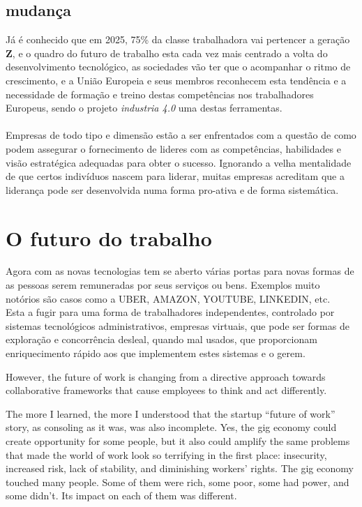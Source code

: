 \subsection{mudança}
Já é conhecido que em \textsf{2025}, 75\% da classe trabalhadora vai pertencer a geração \textbf{Z}, e o quadro do futuro de trabalho esta cada vez mais centrado a volta do desenvolvimento tecnológico, as sociedades vão ter que o acompanhar o ritmo de crescimento, e a União Europeia e seus membros reconhecem esta tendência e a necessidade de formação e treino destas competências nos trabalhadores Europeus, sendo o projeto \textit{industria 4.0} uma destas ferramentas.\\
\\
Empresas de todo tipo e dimensão estão a ser enfrentados com a questão de como podem assegurar o fornecimento de lideres com as competências, habilidades e visão estratégica adequadas para obter o sucesso. Ignorando a velha mentalidade de que certos indivíduos nascem para liderar, muitas empresas acreditam que a liderança pode ser desenvolvida numa forma pro-ativa e de forma sistemática.\cite{book_6}
\section{O futuro do trabalho}
\qquad Agora com as novas tecnologias tem se aberto várias portas para novas formas de as pessoas serem remuneradas por seus serviços ou bens. Exemplos muito notórios são casos como a UBER, AMAZON, YOUTUBE, LINKEDIN, etc.\\

Esta a fugir para uma forma de trabalhadores independentes, controlado por sistemas tecnológicos administrativos, empresas virtuais, que pode ser formas de exploração e concorrência desleal, quando mal usados, que proporcionam enriquecimento rápido aos que implementem estes sistemas e o gerem.

However, the future of work is changing from a directive approach towards collaborative frameworks that cause employees to think and act differently.

The more I learned, the more I understood that the startup “future of work” story, as consoling as it was, was also incomplete. Yes, the gig economy could create opportunity for some people, but it also could amplify the same problems that made the world of work look so terrifying in the first place: insecurity, increased risk, lack of stability, and diminishing workers’ rights. The gig economy touched many people. Some of them were rich, some poor, some had power, and some didn’t. Its impact on each of them was different.


